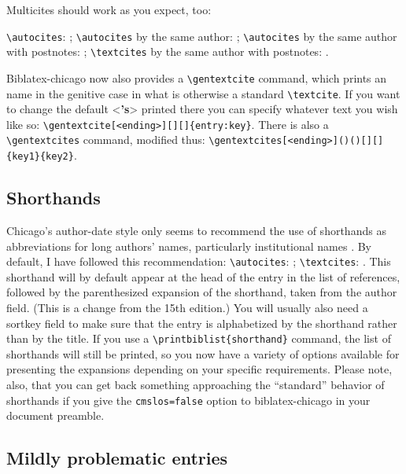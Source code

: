 \documentclass[a4paper,12pt]{report}
\newcommand{\cmd}[1]{\texttt{\textbackslash #1}}
\begin{document}
Multicites should work as you expect, too:

\cmd{autocites}: \autocites{dyna:browser}{eliot:pound};
\cmd{autocites} by the same author:
\autocites{pirumova}{pirumova:russian}; \cmd{autocites} by the same
author with postnotes: \autocites{pirumova}[14]{pirumova:russian};
\cmd{textcites} by the same author with postnotes:
\textcites[37]{pirumova}{pirumova:russian}.

\textsf{Biblatex-chicago} now also provides a \cmd{gentextcite}
command, which prints an  name in the
genitive case in what is otherwise a standard \cmd{textcite}.  If you
want to change the default <\textbf{'s}> printed there you can specify
whatever text you wish like so:
\cmd{gentextcite[<ending>][][]\{entry:key\}}.  There is also a
\cmd{gentextcites} command, modified thus:
\cmd{gentextcites[<ending>]()()[][]\{key1\}\{key2\}}.

\subsection*{Shorthands}
\label{sec:shorthands}

Chicago's author-date style only seems to recommend the use of
shorthands as abbreviations for long authors' names, particularly
institutional names \autocite[15.36]{chicago:manual}.  By default, I
have followed this recommendation: \cmd{autocites}:
\autocites{bsi:abbreviation}{iso:electrodoc}; \cmd{textcites}:
\textcites{bsi:abbreviation}{iso:electrodoc}.  This \textsf{shorthand}
will by default appear at the head of the entry in the list of
references, followed by the parenthesized expansion of the shorthand,
taken from the \textsf{author} field.  (This is a change from the 15th
edition.)  You will usually also need a \textsf{sortkey} field to make
sure that the entry is alphabetized by the \textsf{shorthand} rather
than by the \textsf{title}.  If you use a
\cmd{printbiblist\{shorthand\}} command, the list of shorthands will
still be printed, so you now have a variety of options available for
presenting the expansions depending on your specific requirements.
Please note, also, that you can get back something approaching the
\enquote{standard} behavior of shorthands if you give the
\texttt{cmslos=false} option to \textsf{biblatex-chicago} in your
document preamble.

\subsection*{Mildly problematic entries}
\label{sec:problematic}
\end{document}
